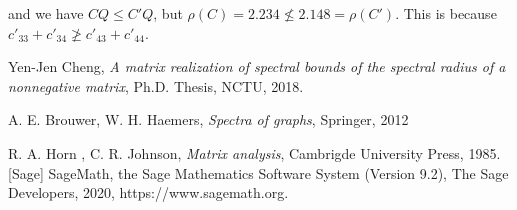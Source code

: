 \documentclass[12pt, a4paper]{article}
\theoremstyle{plain}
\theoremstyle{definition}
\begin{document}
    and we have $CQ\leq C'Q$, but
    $\rho(C)=2.234\not\leq 2.148= \rho(C')$.
    This is because $c'_{33}+c'_{34}\not\geq c'_{43}+c'_{44}$.




\begin{thebibliography}{20}
\normalsize
{}

Yen-Jen Cheng, {\it  A matrix realization of spectral bounds
of the spectral radius of a nonnegative matrix}, Ph.D. Thesis, NCTU, 2018.

A. E. Brouwer, W. H. Haemers, {\it Spectra of graphs}, Springer, 2012

R. A. Horn , C. R. Johnson, {\it Matrix analysis}, Cambrigde University Press, 1985.
[Sage] SageMath, the Sage Mathematics Software System (Version 9.2),
       The Sage Developers, 2020, https://www.sagemath.org.  %

\end{thebibliography}
\end{document}

